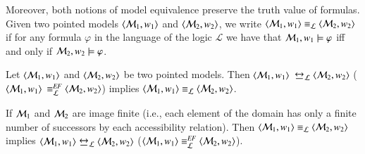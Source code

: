 
%
%


Moreover, both notions of model equivalence preserve
the truth value of formulas. Given two pointed models
$\langle \mathcal{M}_1,w_1 \rangle$ and $\langle \mathcal{M}_2,w_2 \rangle$, we write
$\tup{\model_1,w_1} \linebreak \equiv_\mathcal{L} \tup{\model_2,w_2}$ if for
any formula $\varphi$ in the language of the logic $\mathcal{L}$
we have that $\mathcal{M}_1,w_1 \models \varphi$ iff and only if $\mathcal{M}_2,w_2
\models \varphi$.


\begin{thm}\label{bisim}
Let $\langle \mathcal{M}_1, w_1 \rangle$ and $\langle \mathcal{M}_2,w_2 \rangle$ be two pointed
models. Then $\langle \mathcal{M}_1,w_1 \rangle$ $\bisim_\gL \tup{\gM_2,w_2}$ ($\langle \mathcal{M}_1,w_1 \rangle$ $\equiv^{\mathit{EF}}_{\mathcal{L}} \langle \mathcal{M}_2,w_2 \rangle$) implies
$\langle \mathcal{M}_1,w_1 \rangle \equiv_{\mathcal{L}} \langle \mathcal{M}_2,w_2 \rangle$.

If
$\mathcal{M}_1$ and $\mathcal{M}_2$ are image finite (i.e., each element of the
domain has only a finite number of successors by each accessibility
relation). Then
$\langle \mathcal{M}_1, w_1 \rangle \equiv_{\mathcal{L}} \langle \mathcal{M}_2, w_2 \rangle$  implies
$\tup{\gM_1, w_1} \bisim_\gL \tup{\gM_2, w_2}$ ($\langle \mathcal{M}_1, w_1 \rangle \equiv^{\mathit{EF}}_{\mathcal{L}} \langle \mathcal{M}_2, w_2 \rangle$).
\end{thm}



